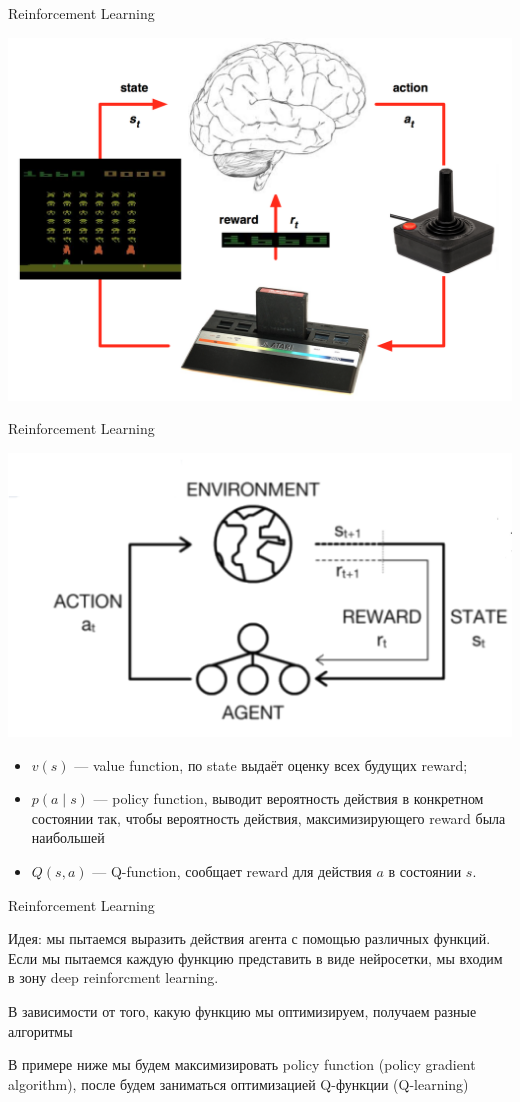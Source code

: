 \documentclass[notes,12pt, aspectratio=169]{beamer}
\newenvironment{wideitemize}{\itemize\addtolength{\itemsep}{10pt}}{\enditemize}
\begin{document}
\begin{frame}{Reinforcement Learning}
\begin{center}
	\includegraphics[width=.7\linewidth]{rl_altari.png}
\end{center}
\end{frame}


\begin{frame}{Reinforcement Learning}
\begin{center}
	\includegraphics[width=.4\linewidth]{rl_1.png}
\end{center}
\begin{itemize}
	\item  \alert{$v(s)$ — value function,} по state выдаёт оценку всех будущих reward;
	\item  \alert{$p(a \mid s)$ — policy function,} выводит вероятность действия в конкретном состоянии так, чтобы вероятность действия, максимизирующего reward была наибольшей 
	\item  \alert{$Q(s,a)$ — Q-function,} сообщает reward для действия $a$ в состоянии $s$.
\end{itemize}
\end{frame}


\begin{frame}{Reinforcement Learning}
\begin{wideitemize}
\item \alert{Идея:} мы пытаемся выразить действия агента с помощью различных функций. Если мы пытаемся каждую функцию представить в виде нейросетки, мы входим в зону deep reinforcment learning. 

\item В зависимости от того, какую функцию мы оптимизируем, получаем разные алгоритмы 

\item В примере ниже мы будем максимизировать policy function (policy gradient algorithm), после будем заниматься оптимизацией Q-функции (Q-learning)
\end{wideitemize}
\end{frame}
\end{document}
